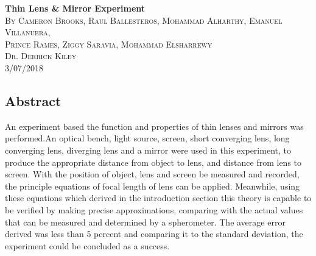 \documentclass[12pt]{article}
\begin{document}
	\begin{center}
	
	\textbf{\Large Thin Lens \& Mirror Experiment}\\
	[2mm]
	
	
	\textsc{ By Cameron Brooks, Raul Ballesteros, Mohammad Alharthy, Emanuel Villanuera,\\ Prince Rames, Ziggy Saravia, Mohammad Elsharrewy
}\\
	[2mm]
	\textsc{Dr. Derrick Kiley}\\
	\textsc{3/07/2018 }\\
	
	\end{center}





\begin{center}
\section*{Abstract}
\end{center} 
\noindent An experiment based the function and properties of thin lenses and mirrors was performed.An optical bench, light source, screen, short converging lens, long converging lens, diverging lens and a mirror were used in this experiment, to produce the appropriate distance from object to
lens, and distance from lens to screen. With the position of object, lens and screen be measured and recorded, the principle equations of focal length of lens can be applied. Meanwhile, using these equations which derived in the introduction section this theory is capable to be verified by making precise approximations, comparing with the actual values that can be measured and determined by a spherometer. The average error derived was less than 5 percent and comparing it to the standard deviation, the experiment could be concluded as a success.
\end{document}
